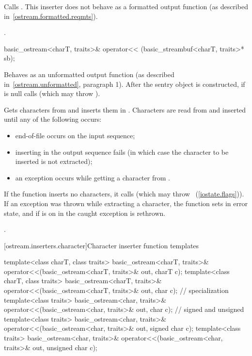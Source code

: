 \begin{itemdescr}
\pnum
\effects
Calls
.
This inserter does not
behave as a formatted output function (as described in~\ref{ostream.formatted.reqmts}).

\pnum
\returns
{}.
\end{itemdescr}

%
\begin{itemdecl}
basic_ostream<charT, traits>& operator<<
    (basic_streambuf<charT, traits>* sb);
\end{itemdecl}

\begin{itemdescr}
\pnum
\effects
Behaves as an unformatted output function (as described in~\ref{ostream.unformatted}, paragraph 1).
After the sentry object is
constructed, if
 is null calls
(which may throw
).

\pnum
Gets characters from 
and inserts them in
.
Characters are read from 
and inserted until any of the following occurs:
\begin{itemize}
\item
end-of-file occurs on the input sequence;
\item
inserting in the output sequence fails
(in which case the character to be inserted is not extracted);
\item
an exception occurs while getting a character from .
\end{itemize}

\pnum
If the function inserts no characters, it calls
(which may throw
~(\ref{iostate.flags})).
If an exception was thrown while extracting a character,
the function sets
in error state, and if
is on in
the caught exception is rethrown.

\pnum
\returns
{}.
\end{itemdescr}

[ostream.inserters.character]{Character inserter function templates}

%
\begin{itemdecl}
template<class charT, class traits>
  basic_ostream<charT, traits>& operator<<(basic_ostream<charT, traits>& out,
                                           charT c);
template<class charT, class traits>
  basic_ostream<charT, traits>& operator<<(basic_ostream<charT, traits>& out,
                                           char c);
  // specialization
template<class traits>
  basic_ostream<char, traits>& operator<<(basic_ostream<char, traits>& out,
                                          char c);
  // signed and unsigned
template<class traits>
  basic_ostream<char, traits>& operator<<(basic_ostream<char, traits>& out,
                                          signed char c);
template<class traits>
  basic_ostream<char, traits>& operator<<(basic_ostream<char, traits>& out,
                                          unsigned char c);
\end{itemdecl}

